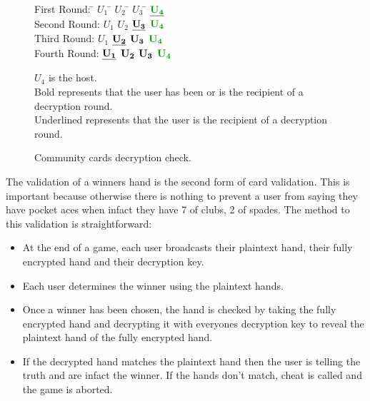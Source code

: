 \documentclass[11pt, oneside]{article}   	%
\begin{document}
\begin{figure}[H]
\caption{Community cards decryption check.}
\vspace{0.2cm} 

\begin{tabbing}
First Round:		\hspace{2.5cm} \=  $U_1$ \hspace{1cm}\= $U_2$ \hspace{1cm}\= $U_3$ \hspace{1cm}\= $\underline{{\bf \color{dkgreen}U_4}}$\\
Second Round: 	\> $U_1$ \> $U_2$ \> $\underline{\bf U_3}$ \> ${\bf \color{dkgreen}U_4}$\\
Third Round:		\>$U_1$ \> $\underline{\bf U_2}$ \>${\bf U_3}$ \>${\bf \color{dkgreen}U_4}$\\
Fourth Round:		\>$\underline{\bf U_1}$ \>${\bf U_2}$ \>${\bf U_3}$ \>${\bf \color{dkgreen}U_4}$\\
\end{tabbing}

{\bf \color{dkgreen}$U_4$} is the host.\\
Bold represents that the user has been or is the recipient of a decryption round.\\
Underlined represents that the user is the recipient of a decryption round.
\vspace{0.2cm} 
\label{fig:com}
\end{figure}

The validation of a winners hand is the second form of card validation. This is important because otherwise there is nothing to prevent a user from saying they have pocket aces when infact they have 7 of clubs, 2 of spades. The method to this validation is straightforward:

\begin{itemize}
\renewcommand{\labelitemi}{$\bullet$}
\item At the end of a game, each user broadcasts their plaintext hand, their fully encrypted hand and their decryption key.
\item Each user determines the winner using the plaintext hands.
\item Once a winner has been chosen, the hand is checked by taking the fully encrypted hand and decrypting it with everyones decryption key to reveal the plaintext hand of the fully encrypted hand.
\item If the decrypted hand matches the plaintext hand then the user is telling the truth and are infact the winner. If the hands don’t match, cheat is called and the game is aborted.
\end{itemize}
\end{document}
